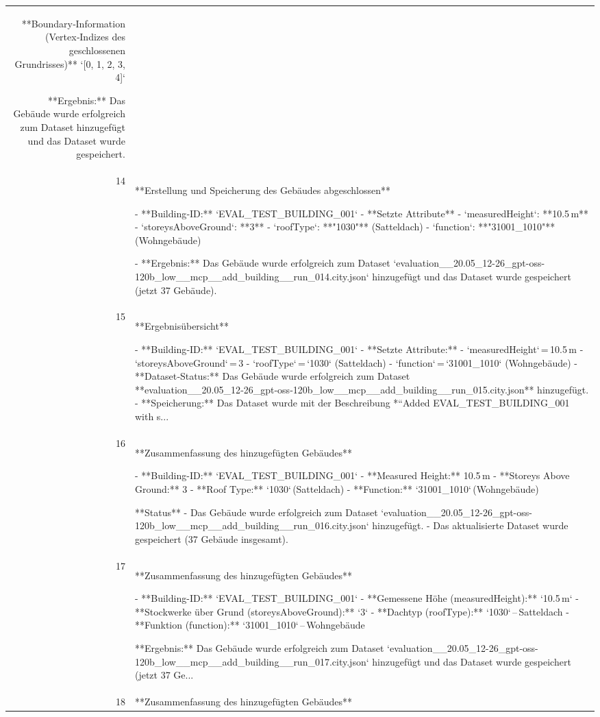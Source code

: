 \documentclass[a4paper,11pt]{article}
\begin{document}
\begin{table}[ht]
\begin{tabular}{r p{12cm}}
**Boundary‑Information (Vertex‑Indizes des geschlossenen Grundrisses)**  
`[0, 1, 2, 3, 4]`  

**Ergebnis:** Das Gebäude wurde erfolgreich zum Dataset hinzugefügt und das Dataset wurde gespeichert. \\
14 & **Erstellung und Speicherung des Gebäudes abgeschlossen**

- **Building‑ID:** `EVAL\_TEST\_BUILDING\_001`  
- **Setzte Attribute**  
  - `measuredHeight`: **10.5 m**  
  - `storeysAboveGround`: **3**  
  - `roofType`: **"1030"** (Satteldach)  
  - `function`: **"31001\_1010"** (Wohngebäude)  

- **Ergebnis:** Das Gebäude wurde erfolgreich zum Dataset `evaluation\_\_20.05\_12-26\_gpt-oss-120b\_low\_\_mcp\_\_add\_building\_\_run\_014.city.json` hinzugefügt und das Dataset wurde gespeichert (jetzt 37 Gebäude). \\
15 & **Ergebnisübersicht**

- **Building‑ID:** `EVAL\_TEST\_BUILDING\_001`  
- **Setzte Attribute:**  
  - `measuredHeight` = 10.5 m  
  - `storeysAboveGround` = 3  
  - `roofType` = `1030` (Satteldach)  
  - `function` = `31001\_1010` (Wohngebäude)  
- **Dataset‑Status:** Das Gebäude wurde erfolgreich zum Dataset **evaluation\_\_20.05\_12‑26\_gpt‑oss‑120b\_low\_\_mcp\_\_add\_building\_\_run\_015.city.json** hinzugefügt.  
- **Speicherung:** Das Dataset wurde mit der Beschreibung *“Added EVAL\_TEST\_BUILDING\_001 with s... \\
16 & **Zusammenfassung des hinzugefügten Gebäudes**

- **Building-ID:** `EVAL\_TEST\_BUILDING\_001`  
- **Measured Height:** 10.5 m  
- **Storeys Above Ground:** 3  
- **Roof Type:** `1030` (Satteldach)  
- **Function:** `31001\_1010` (Wohngebäude)  

**Status**  
- Das Gebäude wurde erfolgreich zum Dataset `evaluation\_\_20.05\_12-26\_gpt-oss-120b\_low\_\_mcp\_\_add\_building\_\_run\_016.city.json` hinzugefügt.  
- Das aktualisierte Dataset wurde gespeichert (37 Gebäude insgesamt). \\
17 & **Zusammenfassung des hinzugefügten Gebäudes**

- **Building-ID:** `EVAL\_TEST\_BUILDING\_001`  
- **Gemessene Höhe (measuredHeight):** `10.5 m`  
- **Stockwerke über Grund (storeysAboveGround):** `3`  
- **Dachtyp (roofType):** `1030` – Satteldach  
- **Funktion (function):** `31001\_1010` – Wohngebäude  

**Ergebnis:** Das Gebäude wurde erfolgreich zum Dataset `evaluation\_\_20.05\_12-26\_gpt-oss-120b\_low\_\_mcp\_\_add\_building\_\_run\_017.city.json` hinzugefügt und das Dataset wurde gespeichert (jetzt 37 Ge... \\
18 & **Zusammenfassung des hinzugefügten Gebäudes**


\end{tabular}
\end{table}
\end{document}
